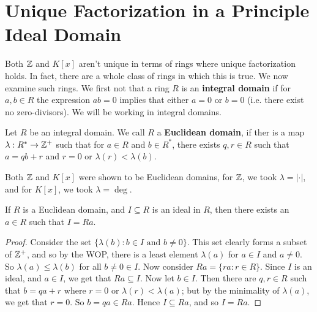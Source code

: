 
\section{Unique Factorization in a Principle Ideal Domain}
\hspace{10mm}

Both $\mathbb{Z}$ and $K[x]$ aren't unique in terms of rings where unique factorization holds. In fact, there are a whole class of rings in which this is true. We now examine such rings. We first not that a ring $R$ is an \textbf{integral domain} if for $a,b \in R$ the expression $ab=0$ implies that either $a=0$ or $b=0$ (i.e. there exist no zero-divisors). We will be working in integral domains.

\begin{definition}
    Let $R$ be an integral domain. We call $R$ a \textbf{Euclidean domain}, if ther is a map $\lambda:R^* \rightarrow \mathbb{Z}^+$ such that for $a \in R$ and $b \in R^*$, there exists $q,r \in R$ such that $a=qb+r$ and $r=0$ or $\lambda(r)<\lambda(b)$.
\end{definition}

\begin{example}
    Both $\mathbb{Z}$ and $K[x]$ were shown to be Euclidean domains, for $\mathbb{Z}$, we took $\lambda=|\cdot|$, and for $K[x]$, we took $\lambda=\deg$. 
\end{example}

\begin{proposition}\label{proposition1.3.1}
    If $R$ is a Euclidean domain, and $I \subseteq R$ is an ideal in $R$, then there exists an $a \in R$ such that $I=Ra$.
\end{proposition}
\begin{proof}
    Consider the set $\{\lambda(b):b \in I \text{ and } b \neq 0\}$. This set clearly forms a subset of $\mathbb{Z}^+$, and so by the WOP, there is a least element $\lambda(a)$ for $a \in I$ and $a \neq 0$. So $\lambda(a) \leq \lambda(b)$ for all $b \neq 0 \in I$. Now consider $Ra=\{ra:r \in R\}$. Since $I$ is an ideal, and $a \in I$, we get that $Ra \subseteq I$. Now let $b \in I$. Then there are $q,r \in R$ such that $b=qa+r$ where $r=0$ or $\lambda(r)<\lambda(a)$; but by the minimality of $\lambda(a)$, we get that $r=0$. So $b=qa \in Ra$. Hence $I \subseteq Ra$, and so $I=Ra$.
\end{proof}

